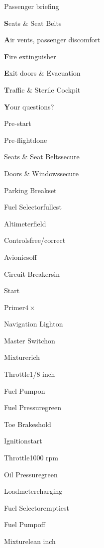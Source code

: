 




\begin{multicols}{2}
\begin{checklist}{Passenger briefing}
  \item{\textbf{S}eats \& Seat Belts}{}
  \item{\textbf{A}ir vents, passenger discomfort}{}
  \item{\textbf{F}ire extinguisher}{}
  \item{\textbf{E}xit doors \& Evacuation}{}
  \item{\textbf{T}raffic \& Sterile Cockpit}{}
  \item{\textbf{Y}our questions?}{}
\end{checklist}

\begin{checklist}{Pre-start}
    \item{Pre-flight}{done}
    \item{Seats \& Seat Belts}{secure}
    \item{Doors \& Windows}{secure}
    \item{Parking Break}{set}
    \item{Fuel Selector}{fullest}
    \item{Altimeter}{field}
    \item{Controls}{free/correct}
    \item{Avionics}{off}
    \item{Circuit Breakers}{in}
\end{checklist}

\begin{checklist}{Start}
    \item{Primer}{$4\times$}
    \item{Navigation Light}{on}
    \item{Master Switch}{on}
    \item{Mixture}{rich}
    \item{Throttle}{1/8 inch}
    \item{Fuel Pump}{on}
    \item{Fuel Pressure}{green}
    \item{Toe Brakes}{hold}
    \item{Ignition}{start}
    \item{Throttle}{1000 rpm}
    \item{Oil Pressure}{green}
    \item{Loadmeter}{charging}
    \item{Fuel Selector}{emptiest}
    \item{Fuel Pump}{off}
    \item{Mixture}{lean  inch}
\end{checklist}


\end{multicols}
